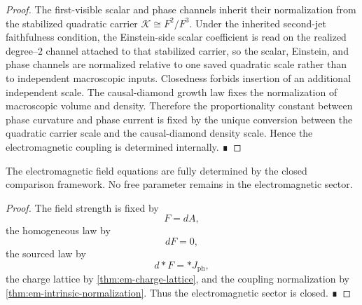\begin{proof}
	The first-visible scalar and phase channels inherit their
	normalization from the stabilized quadratic carrier
	\(\mathcal K\cong F^2/F^3\).
	Under the inherited second-jet faithfulness condition, the
	Einstein-side scalar coefficient is read on the realized
	degree--\(2\) channel attached to that stabilized carrier, so the
	scalar, Einstein, and phase channels are normalized relative to one
	saved quadratic scale rather than to independent macroscopic
	inputs.
	Closedness forbids insertion of an additional independent scale.
	The causal-diamond growth law fixes the normalization of macroscopic
	volume and density.
	Therefore the proportionality constant between phase curvature and phase
	current is fixed by the unique conversion between the quadratic carrier
	scale and the causal-diamond density scale.
	Hence the electromagnetic coupling is determined internally. ∎
\end{proof}
\begin{corollary}
	The electromagnetic field equations are fully determined by the closed
	comparison framework.
	No free parameter remains in the electromagnetic sector.
\end{corollary}
\begin{proof}
	The field strength is fixed by
	\[
		F=dA,
	\]
	the homogeneous law by
	\[
		dF=0,
	\]
	the sourced law by
	\[
		d{*}F={*}J_{\mathrm{ph}},
	\]
	the charge lattice by \cref{thm:em-charge-lattice}, and the coupling
	normalization by \cref{thm:em-intrinsic-normalization}.
	Thus the electromagnetic sector is closed. ∎
\end{proof}
